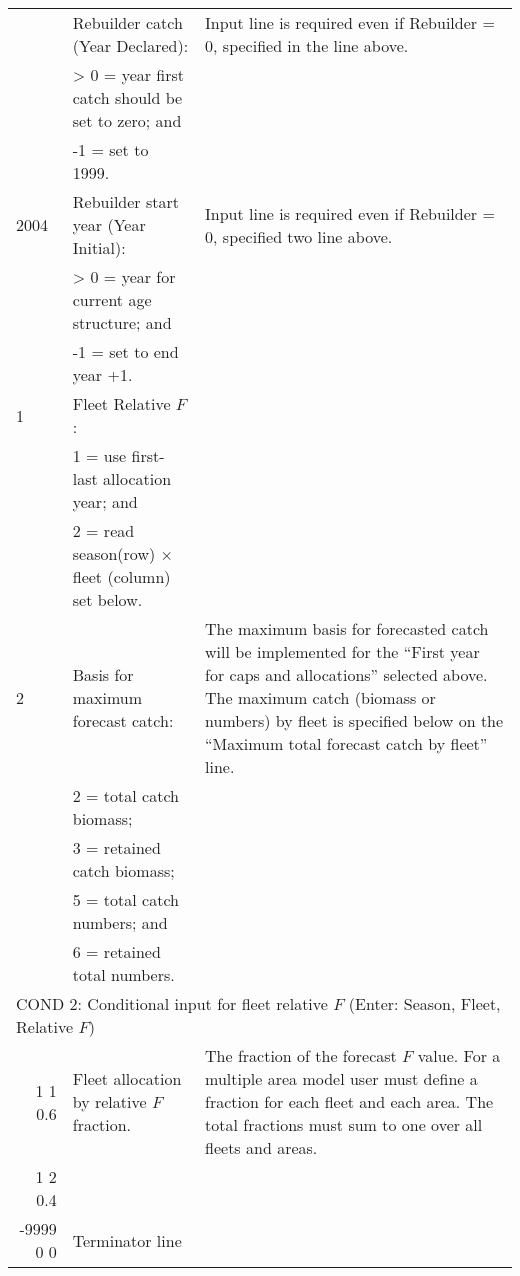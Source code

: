 \begin{landscape}
{\begin{longtable}{p{2cm} p{7cm} p{12cm}}
  \pagebreak
  2004 & Rebuilder catch (Year Declared): & \multirow{1}{1cm}[-0.2cm]{\parbox{12cm}{Input line is required even if Rebuilder = 0, specified in the line above.}} \Tstrut\\
    & > 0 = year first catch should be set to zero; and & \\
    & -1 = set to 1999. & \Bstrut\\

  \hline
  2004 & Rebuilder start year (Year Initial): & \multirow{1}{1cm}[-0.2cm]{\parbox{12cm}{Input line is required even if Rebuilder = 0, specified two line above.}} \Tstrut\\
    & > 0 = year for current age structure; and & \\
    & -1 = set to end year +1. & \Bstrut\\

  \hline
  1 & Fleet Relative $F$: & \Tstrut\\
    & 1 = use first-last allocation year; and & \\
    & 2 = read season(row) $\times$ fleet (column) set below. & \Bstrut\\

  \hline 
  2 & Basis for maximum forecast catch: & \multirow{1}{1cm}[-0.25cm]{\parbox{12cm}{The maximum basis for forecasted catch will be implemented for the ``First year for caps and allocations'' selected above. The maximum catch (biomass or numbers) by fleet is specified below on the ``Maximum total forecast catch by fleet'' line.}} \Tstrut\\
    & 2 = total catch biomass; & \\
    & 3 = retained catch biomass; & \\
    & 5 = total catch numbers; and & \\
    & 6 = retained total numbers. & \Bstrut\\

  \hline 
  \multicolumn{3}{l}{COND 2: Conditional input for fleet relative $F$ (Enter: Season, Fleet, Relative $F$)} \Tstrut\\
  \multicolumn{1}{r}{1 1 0.6} & Fleet allocation by relative $F$ fraction. & \multirow{1}{1cm}[-0.25cm]{\parbox{12cm}{The fraction of the forecast $F$ value. For a multiple area model user must define a fraction for each fleet and each area. The total fractions must sum to one over all fleets and areas.}} \\
  \multicolumn{1}{r}{1 2 0.4} & & \\
  \multicolumn{1}{r}{-9999 0 0} & Terminator line & \Bstrut\\ 


\end{longtable}}
\end{landscape}
